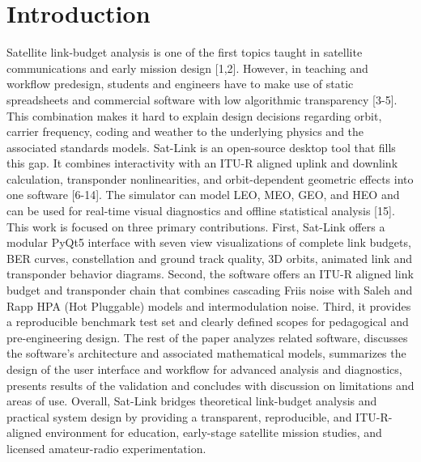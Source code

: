 \documentclass[telecom,article,submit,pdftex,moreauthors]{Definitions/mdpi}
\begin{document}
\section{Introduction}

Satellite link-budget analysis is one of the first topics taught in satellite communications and early mission design [1,2]. However, in teaching and workflow predesign, students and engineers have to make use of static spreadsheets and commercial software with low algorithmic transparency [3-5]. This combination makes it hard to explain design decisions regarding orbit, carrier frequency, coding and weather to the underlying physics and the associated standards models. Sat-Link is an open-source desktop tool that fills this gap. It combines interactivity with an ITU-R aligned uplink and downlink calculation, transponder nonlinearities, and orbit-dependent geometric effects into one software [6-14]. The simulator can model LEO, MEO, GEO, and HEO and can be used for real-time visual diagnostics and offline statistical analysis [15]. This work is focused on three primary contributions. First, Sat-Link offers a modular PyQt5 interface with seven view visualizations of complete link budgets, BER curves, constellation and ground track quality, 3D orbits, animated link and transponder behavior diagrams. Second, the software offers an ITU-R aligned link budget and transponder chain that combines cascading Friis noise with Saleh and Rapp HPA (Hot Pluggable) models and intermodulation noise. Third, it provides a reproducible benchmark test set and clearly defined scopes for pedagogical and pre-engineering design. The rest of the paper analyzes related software, discusses the software's architecture and associated mathematical models, summarizes the design of the user interface and workflow for advanced analysis and diagnostics, presents results of the validation and concludes with discussion on limitations and areas of use.
Overall, Sat-Link bridges theoretical link-budget analysis and practical system design by providing a transparent, reproducible, and ITU-R-aligned environment for education, early-stage satellite mission studies, and licensed amateur-radio experimentation.

\end{document}
